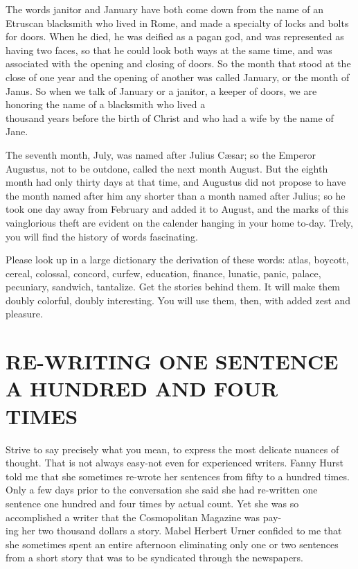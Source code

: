 \documentclass[10pt]{article}
\begin{document}
The words janitor and January have both come down from the name of an Etruscan blacksmith who lived in Rome, and made a specialty of locks and bolts for doors. When he died, he was deified as a pagan god, and was represented as having two faces, so that he could look both ways at the same time, and was associated with the opening and closing of doors. So the month that stood at the close of one year and the opening of another was called January, or the month of Janus. So when we talk of January or a janitor, a keeper of doors, we are honoring the name of a blacksmith who lived a\\
thousand years before the birth of Christ and who had a wife by the name of Jane.

The seventh month, July, was named after Julius Cæsar; so the Emperor Augustus, not to be outdone, called the next month August. But the eighth month had only thirty days at that time, and Augustus did not propose to have the month named after him any shorter than a month named after Julius; so he took one day away from February and added it to August, and the marks of this vainglorious theft are evident on the calender hanging in your home to-day. Trely, you will find the history of words fascinating.

Please look up in a large dictionary the derivation of these words: atlas, boycott, cereal, colossal, concord, curfew, education, finance, lunatic, panic, palace, pecuniary, sandwich, tantalize. Get the stories behind them. It will make them doubly colorful, doubly interesting. You will use them, then, with added zest and pleasure.

\section*{RE-WRITING ONE SENTENCE A HUNDRED AND FOUR TIMES}
Strive to say precisely what you mean, to express the most delicate nuances of thought. That is not always easy-not even for experienced writers. Fanny Hurst told me that she sometimes re-wrote her sentences from fifty to a hundred times. Only a few days prior to the conversation she said she had re-written one sentence one hundred and four times by actual count. Yet she was so accomplished a writer that the Cosmopolitan Magazine was pay-\\
ing her two thousand dollars a story. Mabel Herbert Urner confided to me that she sometimes spent an entire afternoon eliminating only one or two sentences from a short story that was to be syndicated through the newspapers.
\end{document}
